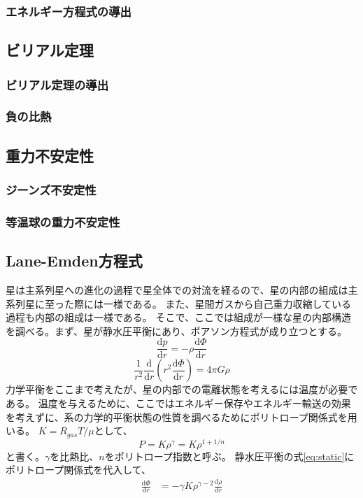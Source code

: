 \documentclass{jsarticle}
\newcommand{\dder}[2][]{\frac{\mathrm{d}#1}{\mathrm{d}#2}}
\begin{document}
\subsubsection{エネルギー方程式の導出}
\subsection{ビリアル定理}
\subsubsection{ビリアル定理の導出}
\subsubsection{負の比熱}
\subsection{重力不安定性}
\subsubsection{ジーンズ不安定性}
\subsubsection{等温球の重力不安定性}

\subsection{Lane-Emden方程式}
星は主系列星への進化の過程で星全体での対流を経るので、星の内部の組成は主系列星に至った際には一様である。
また、星間ガスから自己重力収縮している過程も内部の組成は一様である。
そこで、ここでは組成が一様な星の内部構造を調べる。まず、星が静水圧平衡にあり、ポアソン方程式が成り立つとする。
\begin{equation}
    \dder[p]{r} = - \rho\dder[\Phi]{r}\label{eq:static}
\end{equation}
\begin{equation}
    \frac{1}{r^2}\dder[]{r}(r^2\dder[\Phi]{r}) = 4\pi G\rho\label{eq:poisson}
\end{equation}
力学平衡をここまで考えたが、星の内部での電離状態を考えるには温度が必要である。
温度を与えるために、ここではエネルギー保存やエネルギー輸送の効果を考えずに、系の力学的平衡状態の性質を調べるためにポリトロープ関係式を用いる。
$K = R_{gas}T/\mu$として、
\begin{equation}
    P = K \rho^\gamma = K\rho^{1+1/n}\label{eq:polytropic}
\end{equation}
と書く。$\gamma$を比熱比、$n$をポリトロープ指数と呼ぶ。
静水圧平衡の式\eqref{eq:static}にポリトロープ関係式を代入して、
\begin{align}
    \dder[\Phi]{r} &= - \gamma K \rho^{\gamma -2} \dder[\rho]{r}\label{eq:staticpoly}
\end{align}
\end{document}
